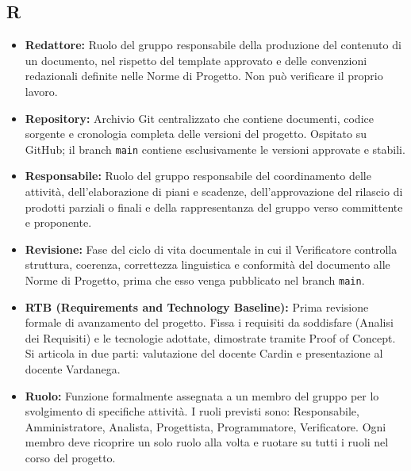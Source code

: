 \subsection*{R}
\begin{itemize}[leftmargin=*]
    \item \textbf{Redattore:} Ruolo del gruppo responsabile della produzione del
          contenuto di un documento, nel rispetto del template approvato e delle
          convenzioni redazionali definite nelle Norme di Progetto. Non può
          verificare il proprio lavoro.
    \item \textbf{Repository:} Archivio Git centralizzato che contiene documenti,
          codice sorgente e cronologia completa delle versioni del progetto.
          Ospitato su GitHub; il branch \texttt{main} contiene esclusivamente le
          versioni approvate e stabili.
    \item \textbf{Responsabile:} Ruolo del gruppo responsabile del coordinamento
          delle attività, dell'elaborazione di piani e scadenze, dell'approvazione
          del rilascio di prodotti parziali o finali e della rappresentanza del
          gruppo verso committente e proponente.
    \item \textbf{Revisione:} Fase del ciclo di vita documentale in cui il
          Verificatore controlla struttura, coerenza, correttezza linguistica e
          conformità del documento alle Norme di Progetto, prima che esso venga
          pubblicato nel branch \texttt{main}.
    \item \textbf{RTB (Requirements and Technology Baseline):} Prima revisione
          formale di avanzamento del progetto. Fissa i requisiti da soddisfare
          (Analisi dei Requisiti) e le tecnologie adottate, dimostrate tramite
          Proof of Concept. Si articola in due parti: valutazione del docente
          Cardin e presentazione al docente Vardanega.
    \item \textbf{Ruolo:} Funzione formalmente assegnata a un membro del gruppo
          per lo svolgimento di specifiche attività. I ruoli previsti sono:
          Responsabile, Amministratore, Analista, Progettista, Programmatore,
          Verificatore. Ogni membro deve ricoprire un solo ruolo alla volta e
          ruotare su tutti i ruoli nel corso del progetto.
\end{itemize}
 
{}
